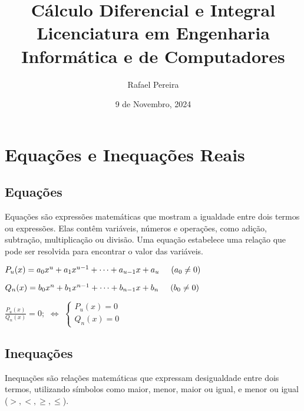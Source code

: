 \documentclass[12pt]{report}
\title{\textbf{\Huge Cálculo Diferencial e Integral}\\
Licenciatura em Engenharia Informática e de Computadores}
\author{Rafael Pereira}
\date{9 de Novembro, 2024}
\begin{document}
\maketitle
\tableofcontents

\chapter{Equações e Inequações Reais}
\section{Equações}
\vspace{2mm}

\large Equações são expressões matemáticas que mostram 
a igualdade entre dois termos ou expressões. 
Elas contêm variáveis, números e operações, 
como adição, subtração, multiplicação ou divisão. 
Uma equação estabelece uma relação que pode ser 
resolvida para encontrar o valor das variáveis. \par
\vspace{2mm}


\begin{center}
  \Large
  $ P_u(x) = a_0x^u + a_1x^{u-1} + \dots + a_{u-1}x + a_u \hspace{5mm} (a_0 \ne 0) $
  \vspace{5mm}

  $ Q_n(x) = b_0x^n + b_1x^{n-1} + \dots + b_{n-1}x + b_n \hspace{5mm} (b_0 \ne 0) $
  \vspace{5mm}

  $\frac{P_u(x)}{Q_n(x)} = 0 ; $
  $ \Leftrightarrow $
  $ \left\{ \begin{array}{rcl}
    P_u(x) = 0 \\
    Q_n(x) = 0
  \end{array}\right.$
\end{center}
\newpage


\section{Inequações}
\vspace{2mm}

\large Inequações são relações matemáticas que 
expressam desigualdade entre dois termos, utilizando 
símbolos como maior, menor, maior ou igual, e menor ou 
igual ($ > , < , \ge , \le  $). \par
\vspace{2mm}
\end{document}

